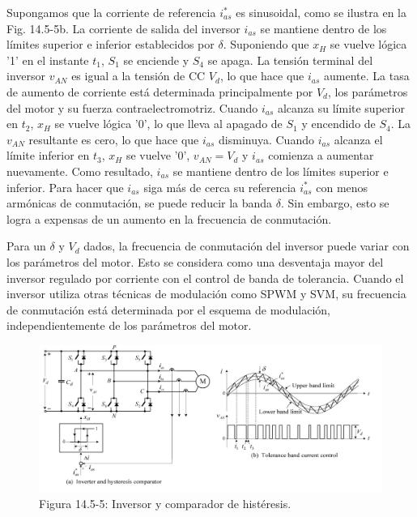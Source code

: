 \documentclass[letterpaper,12pt]{article} %
\begin{document}
Supongamos que la corriente de referencia \( i_{as}^* \) es sinusoidal, como se ilustra en la Fig. 14.5-5b. La corriente de salida del inversor \( i_{as} \) se mantiene dentro de los límites superior e inferior establecidos por \( \delta \). Suponiendo que \( x_H \) se vuelve lógica '1' en el instante \( t_1 \), \( S_1 \) se enciende y \( S_4 \) se apaga. La tensión terminal del inversor \( v_{AN} \) es igual a la tensión de CC \( V_d \), lo que hace que \( i_{as} \) aumente. La tasa de aumento de corriente está determinada principalmente por \( V_d \), los parámetros del motor y su fuerza contraelectromotriz. Cuando \( i_{as} \) alcanza su límite superior en \( t_2 \), \( x_H \) se vuelve lógica '0', lo que lleva al apagado de \( S_1 \) y encendido de \( S_4 \). La \( v_{AN} \) resultante es cero, lo que hace que \( i_{as} \) disminuya. Cuando \( i_{as} \) alcanza el límite inferior en \( t_3 \), \( x_H \) se vuelve '0', \( v_{AN} = V_d \) y \( i_{as} \) comienza a aumentar nuevamente. Como resultado, \( i_{as} \) se mantiene dentro de los límites superior e inferior. Para hacer que \( i_{as} \) siga más de cerca su referencia \( i_{as}^* \) con menos armónicas de conmutación, se puede reducir la banda \( \delta \). Sin embargo, esto se logra a expensas de un aumento en la frecuencia de conmutación.

Para un \( \delta \) y \( V_d \) dados, la frecuencia de conmutación del inversor puede variar con los parámetros del motor. Esto se considera como una desventaja mayor del inversor regulado por corriente con el control de banda de tolerancia. Cuando el inversor utiliza otras técnicas de modulación como SPWM y SVM, su frecuencia de conmutación está determinada por el esquema de modulación, independientemente de los parámetros del motor.

\begin{figure}[ht]
    \centering
    \includegraphics{graficos/img17.jpg} 
    \caption{Figura 14.5-5: Inversor y comparador de histéresis.}
    \label{fig:14.5-5}
\end{figure}
\FloatBarrier
\end{document}
